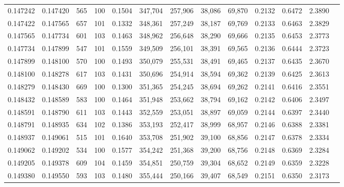 \begin{tabular}{rrrrrrrrrrrrr}
0.147242 & 0.147420 &   565 & 100 &                                     0.1504 & 347,704 & 257,906 &  38,086 &  69,870 & 0.2132 & 0.6472 & 2.3890 \\
0.147422 & 0.147565 &   657 & 101 &                                     0.1332 & 348,361 & 257,249 &  38,187 &  69,769 & 0.2133 & 0.6463 & 2.3829 \\
0.147565 & 0.147734 &   601 & 103 &                                     0.1463 & 348,962 & 256,648 &  38,290 &  69,666 & 0.2135 & 0.6453 & 2.3773 \\
0.147734 & 0.147899 &   547 & 101 &                                     0.1559 & 349,509 & 256,101 &  38,391 &  69,565 & 0.2136 & 0.6444 & 2.3723 \\
0.147899 & 0.148100 &   570 & 100 &                                     0.1493 & 350,079 & 255,531 &  38,491 &  69,465 & 0.2137 & 0.6435 & 2.3670 \\
0.148100 & 0.148278 &   617 & 103 &                                     0.1431 & 350,696 & 254,914 &  38,594 &  69,362 & 0.2139 & 0.6425 & 2.3613 \\
0.148279 & 0.148430 &   669 & 100 &                                     0.1300 & 351,365 & 254,245 &  38,694 &  69,262 & 0.2141 & 0.6416 & 2.3551 \\
0.148432 & 0.148589 &   583 & 100 &                                     0.1464 & 351,948 & 253,662 &  38,794 &  69,162 & 0.2142 & 0.6406 & 2.3497 \\
0.148591 & 0.148790 &   611 & 103 &                                     0.1443 & 352,559 & 253,051 &  38,897 &  69,059 & 0.2144 & 0.6397 & 2.3440 \\
0.148791 & 0.148935 &   634 & 102 &                                     0.1386 & 353,193 & 252,417 &  38,999 &  68,957 & 0.2146 & 0.6388 & 2.3381 \\
0.148937 & 0.149061 &   515 & 101 &                                     0.1640 & 353,708 & 251,902 &  39,100 &  68,856 & 0.2147 & 0.6378 & 2.3334 \\
0.149062 & 0.149202 &   534 & 100 &                                     0.1577 & 354,242 & 251,368 &  39,200 &  68,756 & 0.2148 & 0.6369 & 2.3284 \\
0.149205 & 0.149378 &   609 & 104 &                                     0.1459 & 354,851 & 250,759 &  39,304 &  68,652 & 0.2149 & 0.6359 & 2.3228 \\
0.149380 & 0.149550 &   593 & 103 &                                     0.1480 & 355,444 & 250,166 &  39,407 &  68,549 & 0.2151 & 0.6350 & 2.3173 \\

\end{tabular}
